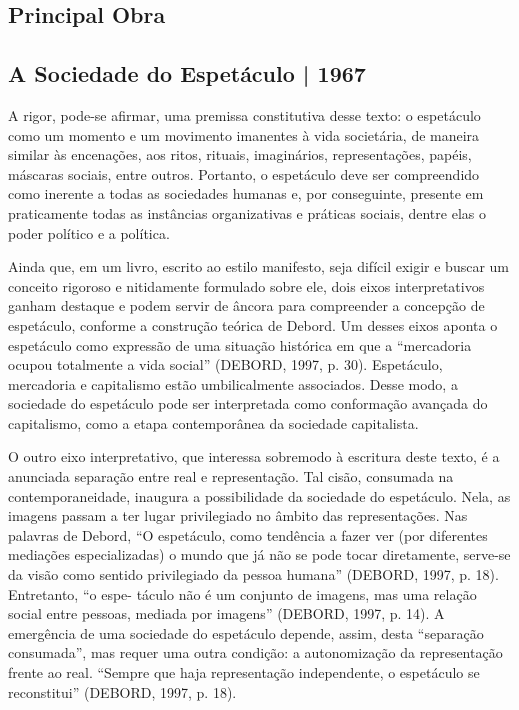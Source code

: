 \documentclass{article}
\begin{document}
\subsection*{Principal Obra}
\subsection*{A Sociedade do Espetáculo | 1967}
A rigor, pode-se afirmar, uma premissa constitutiva
desse texto: o espetáculo como um momento e um movimento imanentes
à vida societária, de maneira similar às encenações, aos ritos, rituais, imaginários, representações, papéis, máscaras sociais, entre outros. Portanto,
o espetáculo deve ser compreendido como inerente a todas as sociedades
humanas e, por conseguinte, presente em praticamente todas as instâncias organizativas e práticas sociais, dentre elas o poder político e a política.

Ainda que, em um livro, escrito ao estilo manifesto, seja difícil exigir e
buscar um conceito rigoroso e nitidamente formulado sobre ele, dois eixos
interpretativos ganham destaque e podem servir de âncora para compreender
a concepção de espetáculo, conforme a construção teórica de Debord.
Um desses eixos aponta o espetáculo como expressão de uma situação histórica em que a “mercadoria ocupou totalmente a vida social”
(DEBORD, 1997, p. 30). Espetáculo, mercadoria e capitalismo estão
umbilicalmente associados. Desse modo, a sociedade do espetáculo pode
ser interpretada como conformação avançada do capitalismo, como a etapa
contemporânea da sociedade capitalista.

O outro eixo interpretativo, que interessa sobremodo à escritura deste
texto, é a anunciada separação entre real e representação. Tal cisão, consumada na contemporaneidade, inaugura a possibilidade da sociedade do
espetáculo. Nela, as imagens passam a ter lugar privilegiado no âmbito
das representações. Nas palavras de Debord, “O espetáculo, como tendência a fazer ver (por diferentes mediações especializadas) o mundo que
já não se pode tocar diretamente, serve-se da visão como sentido privilegiado da pessoa humana” (DEBORD, 1997, p. 18). Entretanto, “o espe-
táculo não é um conjunto de imagens, mas uma relação social entre pessoas, mediada por imagens” (DEBORD, 1997, p. 14). A emergência de
uma sociedade do espetáculo depende, assim, desta “separação consumada”, mas requer uma outra condição: a autonomização da representação
frente ao real. “Sempre que haja representação independente, o espetáculo se reconstitui” (DEBORD, 1997, p. 18).
\end{document}
